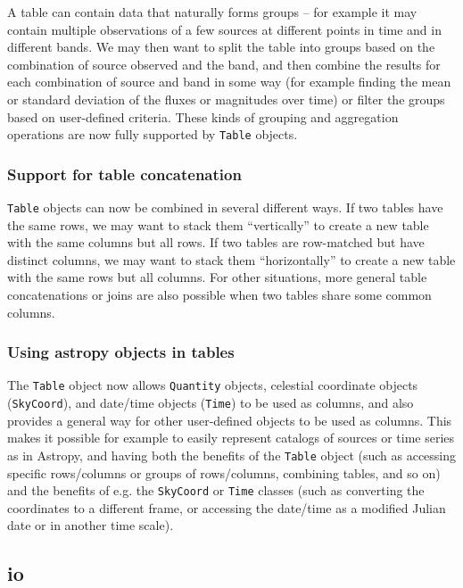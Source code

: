 \documentclass[modern]{aastex61}
\begin{document}
A table can contain data that naturally forms groups -- for example it may
contain multiple observations of a few sources at different points in time
and in different bands. We may then want to split the table into groups based
on the combination of source observed and the band, and then combine the
results for each combination of source and band in some way (for example finding
the mean or standard deviation of the fluxes or magnitudes over time) or filter
the groups based on user-defined criteria. These kinds of grouping and
aggregation operations are now fully supported by \texttt{Table} objects.

\subsubsection{Support for table concatenation}

\texttt{Table} objects can now be combined in several different ways. If two
tables have the same rows, we may want to stack them ``vertically'' to create a
new table with the same columns but all rows. If two tables are row-matched but
have distinct columns, we may want to stack them ``horizontally'' to create a
new table with the same rows but all columns. For other situations, more general
table concatenations or joins are also possible when two tables share some
common columns.

\subsubsection{Using astropy objects in tables}

The \texttt{Table} object now allows \texttt{Quantity} objects, celestial
coordinate objects (\texttt{SkyCoord}), and date/time objects (\texttt{Time}) to
be used as columns, and also provides a general way for other user-defined
objects to be used as columns. This makes it possible for example to easily
represent catalogs of sources or time series as in Astropy, and having both the
benefits of the \texttt{Table} object (such as accessing specific rows/columns
or groups of rows/columns, combining tables, and so on) and the benefits of e.g.
the \texttt{SkyCoord} or \texttt{Time} classes (such as converting the
coordinates to a different frame, or accessing the date/time as a modified
Julian date or in another time scale).

\subsection{io}
\end{document}
